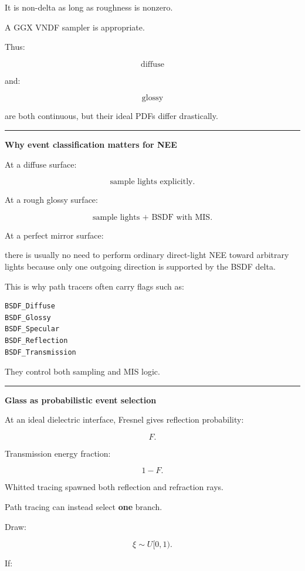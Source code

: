 It is non-delta as long as roughness is nonzero.

A GGX VNDF sampler is appropriate.

Thus:

\[
\text{diffuse}
\]

and:

\[
\text{glossy}
\]

are both continuous, but their ideal PDFs differ drastically.

\begin{center}\rule{0.5\linewidth}{0.5pt}\end{center}

\textbf{Why event classification matters for NEE}

At a diffuse surface:

\[
\text{sample lights explicitly}.
\]

At a rough glossy surface:

\[
\text{sample lights + BSDF with MIS}.
\]

At a perfect mirror surface:

there is usually no need to perform ordinary direct-light NEE toward arbitrary lights because only one outgoing direction is supported by the BSDF delta.

This is why path tracers often carry flags such as:

\begin{verbatim}
BSDF_Diffuse
BSDF_Glossy
BSDF_Specular
BSDF_Reflection
BSDF_Transmission
\end{verbatim}

They control both sampling and MIS logic.

\begin{center}\rule{0.5\linewidth}{0.5pt}\end{center}

\textbf{Glass as probabilistic event selection}

At an ideal dielectric interface, Fresnel gives reflection probability:

\[
F.
\]

Transmission energy fraction:

\[
1-F.
\]

Whitted tracing spawned both reflection and refraction rays.

Path tracing can instead select \textbf{one} branch.

Draw:

\[
\xi\sim U[0,1).
\]

If:

